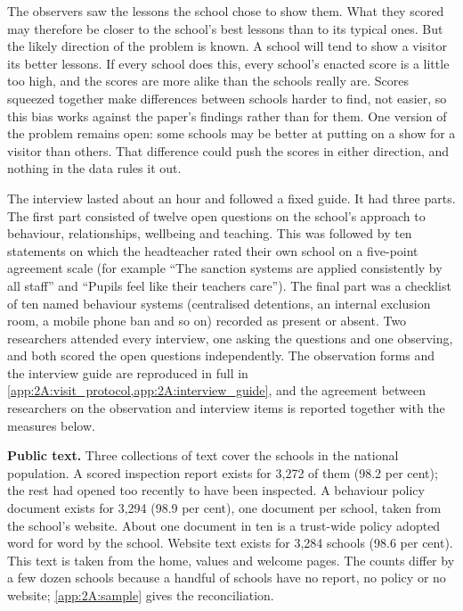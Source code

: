The observers saw the lessons the school chose to show them. What they scored may therefore be closer to the school's best lessons than to its typical ones. But the likely direction of the problem is known. A school will tend to show a visitor its better lessons. If every school does this, every school's enacted score is a little too high, and the scores are more alike than the schools really are. Scores squeezed together make differences between schools harder to find, not easier, so this bias works against the paper's findings rather than for them. One version of the problem remains open: some schools may be better at putting on a show for a visitor than others. That difference could push the scores in either direction, and nothing in the data rules it out.

The interview lasted about an hour and followed a fixed guide. It had three
parts. The first part consisted of twelve open questions on the school's approach to behaviour,
relationships, wellbeing and teaching.
This was followed by ten statements on which the
headteacher rated their own school on a five-point agreement scale (for
example ``The sanction systems are applied consistently by all staff'' and
``Pupils feel like their teachers care''). The final part was a checklist of ten named behaviour systems (centralised detentions, an
internal exclusion room, a mobile phone ban and so on) recorded as present
or absent. Two researchers attended every interview, one asking the
questions and one observing, and both scored the open questions
independently. The observation forms and the interview guide are reproduced
in full in \cref{app:2A:visit_protocol,app:2A:interview_guide}, and the
agreement between researchers on the observation and interview items is reported together
with the measures below.

\textbf{Public text.} Three collections of text cover the schools in the national population. A scored inspection report exists for
3,272 of them (98.2 per cent); the rest had opened too recently to have been
inspected. A behaviour policy document exists for 3,294 (98.9 per cent),
one document per school, taken from the school's website. About one document
in ten is a trust-wide policy adopted word for word by the school. Website
text exists for 3,284 schools (98.6 per cent). This text is taken from the home,
values and welcome pages. The counts differ by a few dozen schools because a
handful of schools have no report, no policy or no website;
\cref{app:2A:sample} gives the reconciliation.

